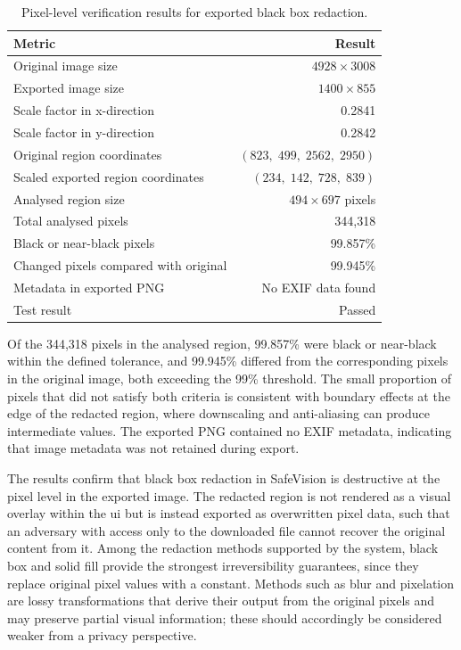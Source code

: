 \begin{table}[H]
\centering
\caption{Pixel-level verification results for exported black box redaction.}
\label{tab:redaction-irreversibility-results}
\begin{tabular}{l r}
\toprule
\textbf{Metric} & \textbf{Result} \\
\midrule
Original image size                    & $4928 \times 3008$ \\
Exported image size                    & $1400 \times 855$ \\
Scale factor in x-direction            & 0.2841 \\
Scale factor in y-direction            & 0.2842 \\
Original region coordinates            & $(823,\; 499,\; 2562,\; 2950)$ \\
Scaled exported region coordinates     & $(234,\; 142,\; 728,\; 839)$ \\
Analysed region size                   & $494 \times 697$ pixels \\
Total analysed pixels                  & 344,318 \\
Black or near-black pixels             & 99.857\% \\
Changed pixels compared with original & 99.945\% \\
Metadata in exported PNG               & No EXIF data found \\
Test result                            & Passed \\
\bottomrule
\end{tabular}
\end{table}

Of the 344,318 pixels in the analysed region, 99.857\% were black or near-black within the defined tolerance, and 99.945\% differed from the corresponding pixels in the original image, both exceeding the 99\% threshold. The small proportion of pixels that did not satisfy both criteria is consistent with boundary effects at the edge of the redacted region, where downscaling and anti-aliasing can produce intermediate values. The exported PNG contained no EXIF metadata, indicating that image metadata was not retained during export.


The results confirm that black box redaction in \gls{SafeVision} is destructive at the pixel level in the exported image. The redacted region is not rendered as a visual overlay within the \acrshort{ui} but is instead exported as overwritten pixel data, such that an adversary with access only to the downloaded file cannot recover 
the original content from it. Among the redaction methods supported by the system, black box and solid fill provide the strongest irreversibility guarantees, since they replace original pixel values with a constant. Methods such as blur and pixelation are lossy transformations that derive their output from the original pixels and may preserve partial visual information; these should accordingly be considered weaker from a privacy perspective.

